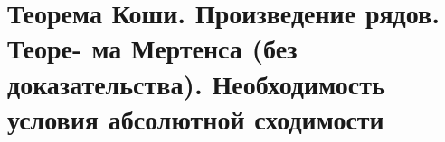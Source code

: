 \section{Теорема Коши. Произведение рядов. Теоре- ма Мертенса (без доказательства). Необходимость условия абсолютной сходимости}
